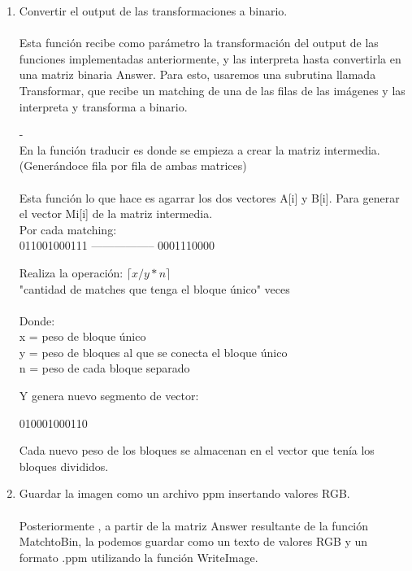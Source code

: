 \documentclass{article}
\newcommand{\TITLE}[1]{\item[#1]}
\begin{document}
		\begin{enumerate}
			\item 	Convertir el output de las transformaciones a binario.\\\\
			Esta función recibe como parámetro la transformación del output de las funciones implementadas anteriormente, y las interpreta hasta convertirla en una matriz binaria Answer. Para esto, usaremos una subrutina llamada Transformar, que recibe un matching de una de las filas de las imágenes y las interpreta y transforma a binario.\\
		-\\
			En la función traducir es donde se empieza a crear la matriz intermedia. (Generándoce fila por fila de ambas matrices)
	\\\\
			Esta función lo que hace es agarrar los dos vectores A[i] y B[i]. Para generar el vector Mi[i] de la matriz intermedia.\\
			
		Por cada matching:\\
		011001000111 ----------------- 0001110000	
		
		Realiza la operación: $\lceil{x/y * n}\rceil$ 
		\\"cantidad de matches que tenga el bloque único" veces\\
		\\Donde:\\ x = peso de bloque único \\ y = peso de bloques al que se  conecta el bloque único \\ n = peso de cada bloque separado
		
		Y genera nuevo segmento de vector:
		
		010001000110				
		
		Cada nuevo peso de los bloques se almacenan en el vector que tenía los bloques divididos.
		
		\item Guardar la imagen como un archivo ppm insertando valores RGB.\\\\
		Posteriormente , a partir de la matriz Answer resultante de la función MatchtoBin, la podemos guardar como un texto de valores RGB y un formato .ppm utilizando la función WriteImage.\\
		
		\end{enumerate}
\end{document}
